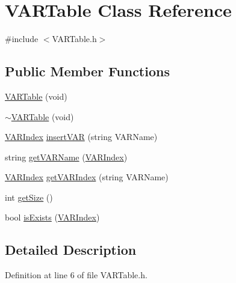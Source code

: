 \hypertarget{class_v_a_r_table}{\section{V\-A\-R\-Table Class Reference}
\label{class_v_a_r_table}
}


{\ttfamily \#include $<$V\-A\-R\-Table.\-h$>$}

\subsection*{Public Member Functions}
\begin{DoxyCompactItemize}
\item 
\hyperlink{class_v_a_r_table_ab4ffd9746e7bce05352a1dd60d0c503e}{V\-A\-R\-Table} (void)
\item 
\hyperlink{class_v_a_r_table_ad24e80818aa35cb9f2bbed38e1f7d736}{$\sim$\-V\-A\-R\-Table} (void)
\item 
\hyperlink{_v_a_r_table_8h_ae716a4a307ade1abe51a35c62d682768}{V\-A\-R\-Index} \hyperlink{class_v_a_r_table_a5341fbc44864bfae2ae862a6e0d525fb}{insert\-V\-A\-R} (string V\-A\-R\-Name)
\item 
string \hyperlink{class_v_a_r_table_a9e1255a72f25a721c845fd02a7b6f7a8}{get\-V\-A\-R\-Name} (\hyperlink{_v_a_r_table_8h_ae716a4a307ade1abe51a35c62d682768}{V\-A\-R\-Index})
\item 
\hyperlink{_v_a_r_table_8h_ae716a4a307ade1abe51a35c62d682768}{V\-A\-R\-Index} \hyperlink{class_v_a_r_table_a3d4abc9505bdbc02744dda496a9a464c}{get\-V\-A\-R\-Index} (string V\-A\-R\-Name)
\item 
int \hyperlink{class_v_a_r_table_a90e1174adf4ace3d2353f07da6776a4d}{get\-Size} ()
\item 
bool \hyperlink{class_v_a_r_table_a3c9005b0a77bcbd7541e446ecf0c9dd4}{is\-Exists} (\hyperlink{_v_a_r_table_8h_ae716a4a307ade1abe51a35c62d682768}{V\-A\-R\-Index})
\end{DoxyCompactItemize}


\subsection{Detailed Description}


Definition at line 6 of file V\-A\-R\-Table.\-h.




